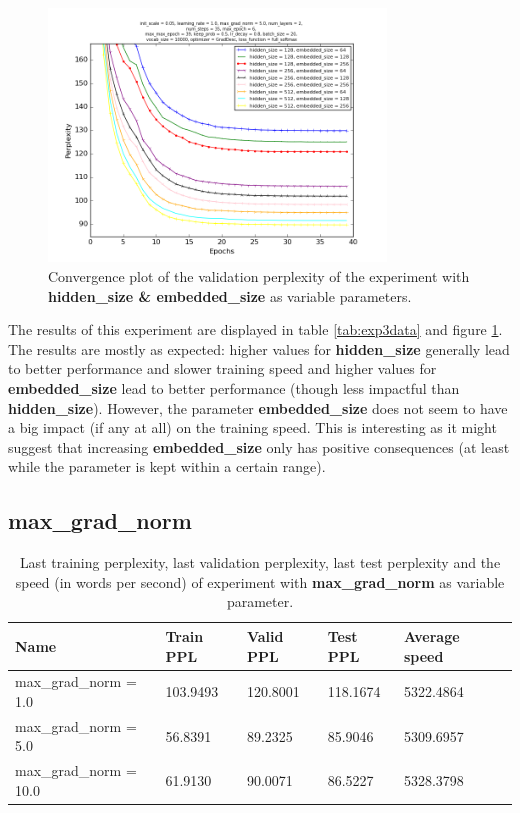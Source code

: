 \documentclass[10pt,a4paper,titlepage]{article}
\begin{document}
\begin{figure}[H]
	\begin{center}
		\includegraphics[width=0.80\textwidth]{Figures/hiddenembeddedperf.png}
		\caption{Convergence plot of the validation perplexity of the experiment with \textbf{hidden\_size \& embedded\_size} as variable parameters.}
		\label{fig:exp3perf}
	\end{center}	
\end{figure}

The results of this experiment are displayed in table \ref{tab:exp3data} and figure \ref{fig:exp3perf}. The results are mostly as expected: higher values for \textbf{hidden\_size} generally lead to better performance and slower training speed and higher values for \textbf{embedded\_size} lead to better performance (though less impactful than \textbf{hidden\_size}). However, the parameter \textbf{embedded\_size} does not seem to have a big impact (if any at all) on the training speed. This is interesting as it might suggest that increasing \textbf{embedded\_size} only has positive consequences (at least while the parameter is kept within a certain range).
\newpage

\subsection{max\_grad\_norm}

\begin{table}[H]
\centering
\caption{Last training perplexity, last validation perplexity, last test perplexity and the speed (in words per second) of experiment with \textbf{max\_grad\_norm} as variable parameter.}
\label{tab:exp4data}
\begin{tabular}{|l|l|l|l|l|l|}
\hline
{\small Name} & {\small Train PPL} & {\small Valid PPL} & {\small Test PPL} & {\small Average speed}\\ \hline
{\small max\_grad\_norm = 1.0}                           & 103.9493   & 120.8001   & 118.1674   & 5322.4864  \\ \hline
{\small max\_grad\_norm = 5.0 }                          & 56.8391    & 89.2325    & 85.9046    & 5309.6957  \\ \hline
{\small max\_grad\_norm = 10.0 }                         & 61.9130    & 90.0071    & 86.5227    & 5328.3798  \\ \hline
\end{tabular}
\end{table}
\end{document}
